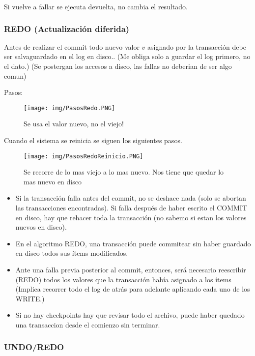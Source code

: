 Si vuelve a fallar se ejecuta devuelta, no cambia el resultado.


\newpage
\subsubsection*{REDO (Actualización diferida)}
Antes de realizar el commit todo nuevo valor $v$ asignado por la transacción debe ser salvaguardado en el log en disco.. (Me obliga solo a guardar el log primero, no el dato.) (Se postergan los accesos a disco, las fallas no deberian de ser algo comun)

\medskip
Pasos:
\begin{figure}[!htb]
    \centering
    \texttt{[image: img/PasosRedo.PNG]}
    \caption{Se usa el valor nuevo, no el viejo!}
\end{figure}


\medskip
Cuando el sistema se reinicia se siguen los siguientes pasos.
\begin{figure}[!htb]
    \centering
    \texttt{[image: img/PasosRedoReinicio.PNG]}
    \caption{Se recorre de lo mas viejo a lo mas nuevo. Nos tiene que quedar lo mas nuevo en disco}
\end{figure}

\begin{itemize}
\item Si la transacción falla antes del commit, no se deshace nada (solo se abortan las transacciones encontradas). Si falla después de haber escrito el COMMIT en disco, hay que rehacer toda la transacción (no sabemo si estan los valores nuevos en disco).
\item En el algoritmo REDO, una transacción puede commitear sin haber guardado en disco todos sus ítems modificados.
\item Ante una falla previa posterior al commit, entonces, será necesario reescribir (REDO) todos los valores que la transacción había asignado a los ítems (Implica recorrer todo el log de atrás para adelante aplicando cada uno de los WRITE.)
\item Si no hay checkpoints hay que revisar todo el archivo, puede haber quedado una transaccion desde el comienzo sin terminar.
\end{itemize}


\newpage
\subsubsection*{UNDO/REDO}


